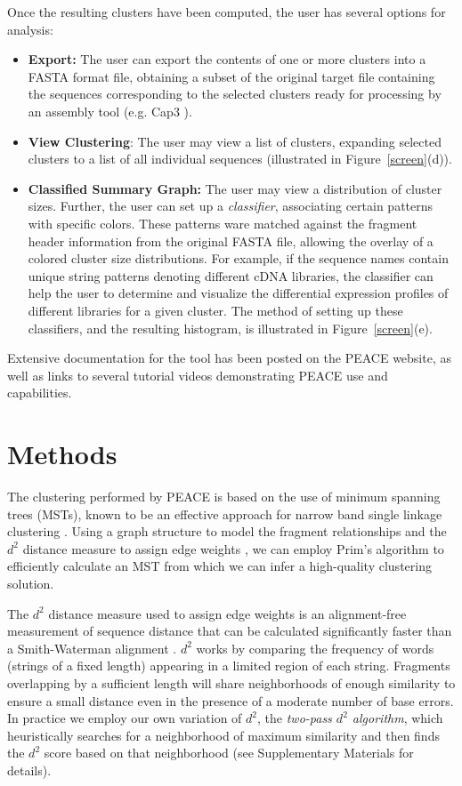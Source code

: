 \documentclass[a4,center,fleqn]{NAR}
\newcommand{\peace} {{\small PEACE}}
\newcommand{\capthree} {{\small Cap3}}
\begin{document}
 Once the resulting clusters have been
computed, the user has several options for analysis:
\begin{itemize}
\item {\bf Export:} The user can export the contents of one or more
  clusters into a FASTA format file, obtaining a subset of the
  original target file containing the sequences corresponding to the
  selected clusters ready for processing by an assembly tool
  (e.g. \capthree\/ \cite{Huang99}).
\item {\bf View Clustering}: The user may view a list of clusters,
  expanding selected clusters to a list of all individual sequences
  (illustrated in Figure~\ref{screen}(d)).
\item {\bf Classified Summary Graph:} The user may view a distribution
  of cluster sizes.  Further, the user can set up a {\it classifier},
  associating certain patterns with specific colors.  These patterns
  ware matched against the fragment header information from the
  original FASTA file, allowing the overlay of a colored cluster size
  distributions.  For example, if the sequence names contain unique
  string patterns denoting different cDNA libraries, the classifier
  can help the user to determine and visualize the differential
  expression profiles of different libraries for a given cluster.  The
  method of setting up these classifiers, and the resulting histogram,
  is illustrated in Figure~\ref{screen}(e).
\end{itemize}
Extensive documentation for the tool has been posted on the \peace\/ website, as well as links to several tutorial videos
demonstrating \peace\/ use and capabilities.


\section{Methods}

The clustering performed by \peace\/ is based on the use of minimum
spanning trees (MSTs), known to be an effective approach for narrow
band single linkage clustering \cite{Jain99,Wan08}.  Using a graph
structure to model the fragment relationships and the $d^2$ distance
measure to assign edge weights \cite{Hide94}, we can employ Prim's
algorithm \cite{Prim57} to efficiently calculate an MST from which we
can infer a high-quality clustering solution.

The $d^2$ distance measure used to assign edge weights is an
alignment-free measurement of sequence distance that can be calculated
significantly faster than a Smith-Waterman alignment \cite{Hide94}.
$d^2$ works by comparing the frequency of words (strings of a fixed
length) appearing in a limited region of each string.  Fragments
overlapping by a sufficient length will share neighborhoods of enough
similarity to ensure a small distance even in the presence of a
moderate number of base errors.  In practice we employ our own
variation of $d^2$, the {\it two-pass $d^2$ algorithm}, which
heuristically searches for a neighborhood of maximum similarity and
then finds the $d^2$ score based on that neighborhood (see
Supplementary Materials for details).
\end{document}
